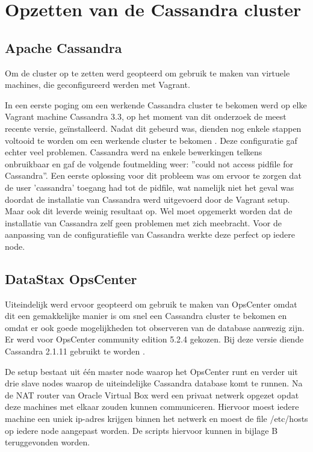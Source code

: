 \chapter{Opzetten van de Cassandra cluster}
\label{ch:cassandra_cluster}

\section{Apache Cassandra}
Om de cluster op te zetten werd geopteerd om gebruik te maken van virtuele machines, die geconfigureerd werden met Vagrant.

In een eerste poging om een werkende Cassandra cluster te bekomen werd op elke Vagrant machine Cassandra 3.3, op het moment van dit onderzoek de meest recente versie, geïnstalleerd.
Nadat dit gebeurd was, dienden nog enkele stappen voltooid te worden om een werkende cluster te bekomen \citep{DataStax2016}.
Deze configuratie gaf echter veel problemen.
Cassandra werd na enkele bewerkingen telkens onbruikbaar en gaf de volgende foutmelding weer: ''could not access pidfile for Cassandra''.
Een eerste oplossing voor dit probleem was om ervoor te zorgen dat de user 'cassandra' toegang had tot de pidfile, wat namelijk niet het geval was doordat de installatie van Cassandra werd uitgevoerd door de Vagrant setup.
Maar ook dit leverde weinig resultaat op.
Wel moet opgemerkt worden dat de installatie van Cassandra zelf geen problemen met zich meebracht.
Voor de aanpassing van de configuratiefile van Cassandra werkte deze perfect op iedere node.

\section{DataStax OpsCenter}

Uiteindelijk werd ervoor geopteerd om gebruik te maken van OpsCenter omdat dit een gemakkelijke manier is om snel een Cassandra cluster te bekomen en omdat er ook goede mogelijkheden tot observeren van de database aanwezig zijn.
Er werd voor OpsCenter community edition 5.2.4 gekozen.
Bij deze versie diende Cassandra 2.1.11 gebruikt te worden \citep{Cantoni2016}.

De setup bestaat uit één master node waarop het OpsCenter runt en verder uit drie slave nodes waarop de uiteindelijke Cassandra database komt te runnen.
Na de NAT router van Oracle Virtual Box werd een privaat netwerk opgezet opdat deze machines met elkaar zouden kunnen communiceren.
Hiervoor moest iedere machine een uniek ip-adres krijgen binnen het netwerk en moest de file /etc/hosts op iedere node aangepast worden.
De scripts hiervoor kunnen in bijlage B teruggevonden worden.

